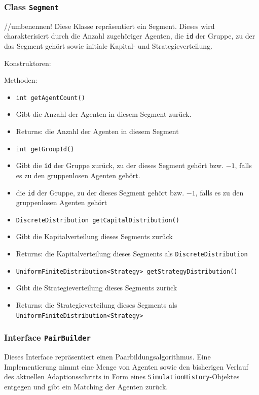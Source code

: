 \documentclass[parskip=full,11pt]{scrartcl}
\begin{document}
\subsubsection{Class \texttt{Segment}}
//umbenennen!
Diese Klasse repräsentiert ein Segment. Dieses wird charakterisiert durch die Anzahl zugehöriger Agenten, die \texttt{id} der Gruppe, zu der das Segment gehört sowie initiale Kapital- und Strategieverteilung.

Konstruktoren:

Methoden:
\begin{itemize}\itemsep -10pt
\item \texttt{int getAgentCount()}
\item[] Gibt die Anzahl der Agenten in diesem Segment zurück.
\item[] Returns: die Anzahl der Agenten in diesem Segment

\item \texttt{int getGroupId()}
\item[] Gibt die \texttt{id} der Gruppe zurück, zu der dieses Segment gehört bzw. \(-1\), falls es zu den gruppenlosen Agenten gehört.
\item[]die \texttt{id} der Gruppe, zu der dieses Segment gehört bzw. \(-1\), falls es zu den gruppenlosen Agenten gehört

\item \texttt{DiscreteDistribution getCapitalDistribution()}
\item[] Gibt die Kapitalverteilung dieses Segments zurück
\item[] Returns: die Kapitalverteilung dieses Segments als \texttt{DiscreteDistribution}

\item \texttt{UniformFiniteDistribution<Strategy> getStrategyDistribution()}
\item[] Gibt die Strategieverteilung dieses Segments zurück
\item[] Returns: die Strategieverteilung dieses Segments als \texttt{UniformFiniteDistribution<Strategy>}
\end{itemize}

\subsubsection{Interface \texttt{PairBuilder}}
Dieses Interface repräsentiert einen Paarbildungsalgorithmus. Eine Implementierung nimmt eine Menge von Agenten sowie den bisherigen Verlauf des aktuellen Adaptionsschritts in Form eines \texttt{SimulationHistory}-Objektes entgegen und gibt ein Matching der Agenten zurück.
\end{document}
